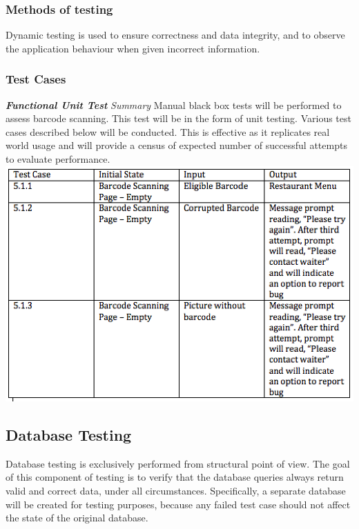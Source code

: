 \documentclass[12pt]{article}
\begin{document}
\subsubsection{Methods of testing}
Dynamic testing is used to ensure correctness and data integrity, and to observe the application behaviour when given incorrect information.

\subsubsection{Test Cases}
\textbf{\textit{Functional Unit Test}}\newline
\newline
\textit{Summary}\newline
Manual black box tests will be performed to assess barcode scanning. This test will be in the form of unit testing. Various test cases described below will be conducted. This is effective as it replicates real world usage and will provide a census of expected number of successful attempts to evaluate performance.
\newline
\includegraphics{Barcode.png}\newline

\subsection{Database Testing}
Database testing is exclusively performed from structural point of view. The goal of this component of testing is to verify that the database queries always return valid and correct data, under all circumstances. Specifically, a separate database will be created for testing purposes, because any failed test case should not affect the state of the original database. 
\end{document}

